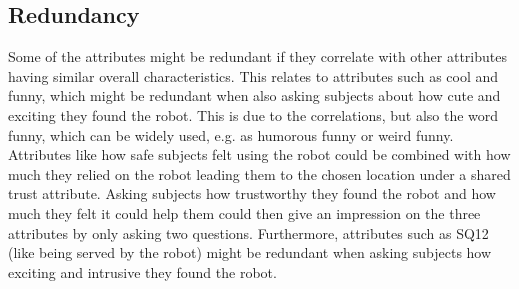 \subsection{Redundancy}
%
Some of the attributes might be redundant if they correlate with other attributes having similar overall characteristics. This relates to attributes such as cool and funny, which might be redundant when also asking subjects about how cute and exciting they found the robot. This is due to the correlations, but also the word funny, which can be widely used, e.g. as humorous funny or weird funny. Attributes like how safe subjects felt using the robot could be combined with how much they relied on the robot leading them to the chosen location under a shared trust attribute. Asking subjects how trustworthy they found the robot and how much they felt it could help them could then give an impression on the three attributes by only asking two questions. Furthermore, attributes such as SQ12 (like being served by the robot) might be redundant when asking subjects how exciting and intrusive they found the robot.



